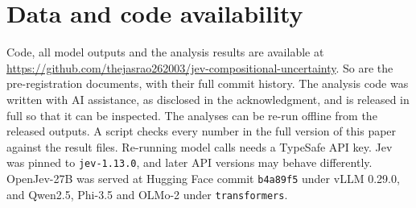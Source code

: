 \section*{Data and code availability}

Code, all model outputs and the analysis results are available at
\url{https://github.com/thejasrao262003/jev-compositional-uncertainty}.
So are the pre-registration documents, with their full commit history.
The analysis code was written with AI assistance, as disclosed in the
acknowledgment, and is released in full so that it can be inspected.
The analyses can be re-run offline from the released outputs. A script
checks every number in the full version of this paper against the
result files. Re-running model calls needs a TypeSafe API key. Jev was pinned to \texttt{jev-1.13.0}, and later API versions may behave
differently. OpenJev-27B was served at Hugging Face commit
\texttt{b4a89f5} under vLLM 0.29.0, and Qwen2.5, Phi-3.5 and OLMo-2 under
\texttt{transformers}.
